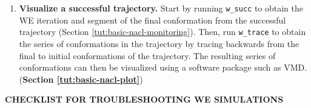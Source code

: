 \begin{enumerate}
\begin{enumerate}
\item \textbf{Visualize a successful trajectory.}
Start by running \verb|w_succ| to obtain the WE iteration and segment of the final conformation from the successful trajectory (Section \ref{tut:basic-nacl-monitoring}). 
Then, run \verb|w_trace| to obtain the series of conformations in the trajectory by tracing backwards from the final to initial conformations of the trajectory. 
The resulting series of conformations can then be visualized using a software package such as VMD. (\textbf{Section \ref{tut:basic-nacl-plot}})
\end{enumerate}
\end{enumerate}

\newpage
\begin{center}
\begin{LARGE}
    \textbf{CHECKLIST FOR TROUBLESHOOTING WE SIMULATIONS}
\end{LARGE}
\end{center}

